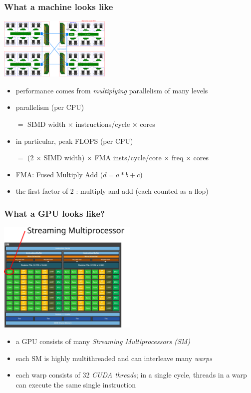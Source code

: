 \documentclass[12pt,dvipdfmx]{beamer}
\newcommand{\ao}[1]{{\color{blue}#1}}
\begin{document}
\begin{frame}
\frametitle{What a machine looks like}
\includegraphics[width=0.40\textwidth]{out/pdf/svg/diagram_multisocket.pdf} \hspace{0.05\textwidth} \def\svgwidth{0.45\textwidth} %

\begin{itemize}
\item performance comes from \ao{\textit{multiplying}} parallelism of many levels
\item parallelism (per CPU)
\begin{center}
$=$ SIMD width $\times$ instructions/cycle $\times$ cores 
\end{center}
\item in particular, peak FLOPS (per CPU)
\begin{center}
$=$ (2 $\times$ SIMD width) $\times$ FMA insts/cycle/core $\times$ freq $\times$ cores
\end{center}
\item FMA: Fused Multiply Add ($d = a * b + c$)
\item the first factor of 2 : multiply and add (each counted as a flop)
\end{itemize}
\end{frame}


\begin{frame}
\frametitle{What a GPU looks like?}
\begin{center}
\includegraphics[width=0.5\textwidth]{out/pdf/svg/gpu.pdf}
\end{center}

\begin{itemize}
\item a GPU consists of many \ao{\it Streaming Multiprocessors (SM)}
\item each SM is highly multithreaded and can interleave many \ao{\it warps\/}
\item each warp consists of 32 \ao{\it CUDA threads}; in a single cycle,
  threads in a warp can execute the same single instruction
\end{itemize}

\end{frame}
\end{document}
